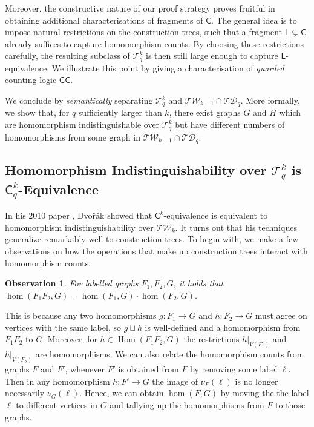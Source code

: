 \documentclass[10pt,a4paper]{article}
\newcommand{\TW}{\ensuremath{\mathcal{TW}}}
\newcommand{\Ekq}{\ensuremath{\mathcal{T}_{q}^{k}}}
\newcommand{\lC} {\ensuremath{\mathsf C}}
\newcommand{\lL} {\ensuremath{\mathsf L}}
\newcommand{\lGC}{\ensuremath{\mathsf{GC}}}
\DeclareMathOperator{\HOM}{Hom}
\newcommand\restrict[1]{\vert_{#1}}
\newtheorem{observation}[theorem]{Observation}
\begin{document}
Moreover, the constructive nature of our proof strategy proves fruitful in obtaining additional characterisations of fragments of $\lC$. The general idea is to impose natural restrictions on the construction trees, such that a fragment $\lL \subsetneq \lC$ already suffices to capture homomorphism counts. By choosing these restrictions carefully, the resulting subclass of $\Ekq$ is then still large enough to capture $\lL$-equivalence. We illustrate this point by giving a characterisation of \emph{guarded} counting logic $\lGC$.

We conclude by \emph{semantically} separating $\Ekq$ and $\mathcal{TW}_{k-1} \cap \mathcal{TD}_q$. More formally, we show that, for $q$ sufficiently larger than $k$, there exist graphs $G$ and $H$ which are homomorphism indistinguishable over $\Ekq$ but have different numbers of homomorphisms from some graph in $\mathcal{TW}_{k-1} \cap \mathcal{TD}_q$.


 
\subsection{Homomorphism Indistinguishability over $\Ekq$ is $\lC^k_q$-Equivalence}
\label{subsec:ckq}
In his 2010 paper \cite{dvorak_recognizing_2010}, Dvo\v{r}ák showed that $\lC^k$-equivalence is equivalent to homomorphism indistinguishability over $\TW_k$. It turns out that his techniques generalize remarkably well to construction trees.
To begin with, we make a few observations on how the operations that make up construction trees interact with homomorphism counts.



\begin{observation}\label{prp:homproducts}
  For labelled graphs $F_1, F_2, G$, it holds that $\hom(F_1F_2, G) = \hom(F_1, G) \cdot \hom(F_2, G)$.
\end{observation}

This is because any two homomorphisms $g \colon F_1 \to G$ and $h \colon F_2 \to G$ must agree on vertices with the same label, so $g \sqcup h$ is well-defined and a homomorphism from $F_1F_2$ to $G$. Moreover, for $h \in \HOM(F_1F_2, G)$ the restrictions $h\restrict{V(F_1)}$ and $h\restrict{V(F_2)}$ are homomorphisms. We can also relate the homomorphism counts from graphs $F$ and $F'$, whenever $F'$ is obtained from $F$ by removing some label $\ell$. Then in any homomorphism $h \colon F' \to G$ the image of $\nu_F(\ell)$ is no longer necessarily $\nu_G(\ell)$. Hence, we can obtain $\hom(F, G)$ by moving the the label $\ell$ to different vertices in $G$ and tallying up the homomorphisms from $F$ to those graphs.
\end{document}
